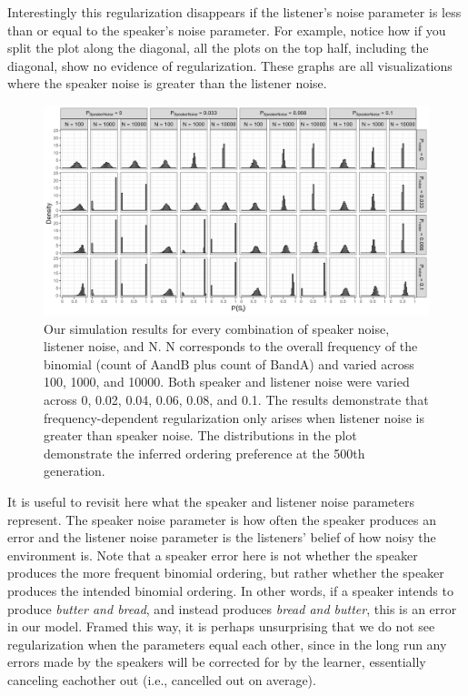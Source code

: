 \documentclass[10pt, letterpaper]{article}
\newenvironment{CodeChunk}{}{}
\begin{document}
Interestingly this regularization disappears if the listener's noise
parameter is less than or equal to the speaker's noise parameter. For
example, notice how if you split the plot along the diagonal, all the
plots on the top half, including the diagonal, show no evidence of
regularization. These graphs are all visualizations where the speaker
noise is greater than the listener noise.

\begin{CodeChunk}
\begin{figure}[tb]
\includegraphics[width=1\linewidth]{Figures/full_plot_smaller} \caption[Our simulation results for every combination of speaker noise, listener noise, and N]{Our simulation results for every combination of speaker noise, listener noise, and N. N corresponds to the overall frequency of the binomial (count of AandB plus count of BandA) and varied across 100, 1000, and 10000. Both speaker and listener noise were varied across 0, 0.02, 0.04, 0.06, 0.08, and 0.1. The results demonstrate that frequency-dependent regularization only arises when listener noise is greater than speaker noise. The distributions in the plot demonstrate the inferred ordering preference at the 500th generation.}\label{fig:fullsimsplot}
\end{figure}
\end{CodeChunk}

It is useful to revisit here what the speaker and listener noise
parameters represent. The speaker noise parameter is how often the
speaker produces an error and the listener noise parameter is the
listeners' belief of how noisy the environment is. Note that a speaker
error here is not whether the speaker produces the more frequent
binomial ordering, but rather whether the speaker produces the intended
binomial ordering. In other words, if a speaker intends to produce
\emph{butter and bread}, and instead produces \emph{bread and butter},
this is an error in our model. Framed this way, it is perhaps
unsurprising that we do not see regularization when the parameters equal
each other, since in the long run any errors made by the speakers will
be corrected for by the learner, essentially canceling eachother out
(i.e., cancelled out on average).
\end{document}
